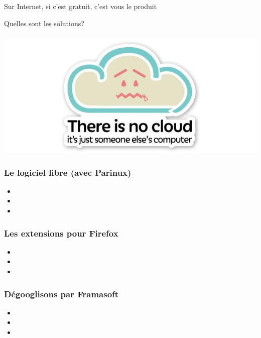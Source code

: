 \documentclass{beamer}
\begin{document}
\begin{frame}
\begin{center}
\Huge{Sur Internet, si c'est gratuit, c'est vous le produit }
\end{center}
\end{frame}

\begin{frame}
\begin{center}
\Huge{Quelles sont les solutions?}
\\~\\ \includegraphics[scale=0.4]{./images/cloud.png}
\end{center}
\end{frame}

\begin{frame}
\frametitle{Le logiciel libre (avec Parinux)}
\begin{itemize}
\item 
\item 
\item 
\end{itemize}
\end{frame}

\begin{frame}
\frametitle{Les extensions pour Firefox}
\begin{itemize}
\item 
\item 
\item 
\end{itemize}
\end{frame}
\begin{frame}
\frametitle{Dégooglisons par Framasoft}
\begin{itemize}
\item 
\item 
\item 
\end{itemize}
\end{frame}
\end{document}
